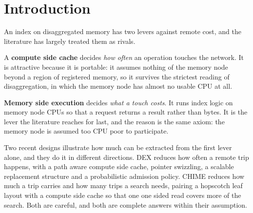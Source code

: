\documentclass[sigconf,nonacm]{acmart}
\begin{document}
\begin{abstract}
CHIME, whose compute cache holds internal nodes only, separates the two levers
even more cleanly, because its sweep crosses the point at which its internal index
stops fitting and throughput falls by 3.7 times in a single step. Caching raises
the plateau above that boundary and does almost nothing below it; memory side
execution removes the cliff below it and is exactly inert above it. Used together
they exceed what either reaches alone. Finally we report a deliberate
falsification: an optimisation that shrank the bytes per covered leaf roughly
fortyfold while leaving the number of crossings unchanged lost 41\% of throughput,
and lost 15\% even at a 59\% cache hit rate. Given a path that removes crossings
instead, the same mechanism gains 19\%.
\end{abstract}

\maketitle

\section{Introduction}
\label{sec:intro}

An index on disaggregated memory has two levers against remote cost, and the
literature has largely treated them as rivals.

A \textbf{compute side cache} decides \emph{how often} an operation touches the
network. It is attractive because it is portable: it assumes nothing of the
memory node beyond a region of registered memory, so it survives the strictest
reading of disaggregation, in which the memory node has almost no usable CPU at
all.

\textbf{Memory side execution} decides \emph{what a touch costs}. It runs index
logic on memory node CPUs so that a request returns a result rather than bytes.
It is the lever the literature reaches for last, and the reason is the same
axiom: the memory node is assumed too CPU poor to participate.

Two recent designs illustrate how much can be extracted from the first lever
alone, and they do it in different directions. DEX reduces how often a remote
trip happens, with a path aware compute side cache, pointer swizzling, a scalable
replacement structure and a probabilistic admission policy. CHIME reduces how
much a trip carries and how many trips a search needs, pairing a hopscotch leaf
layout with a compute side cache so that one one sided read covers more of the
search. Both are careful, and both are complete answers within their assumption.
\end{document}
